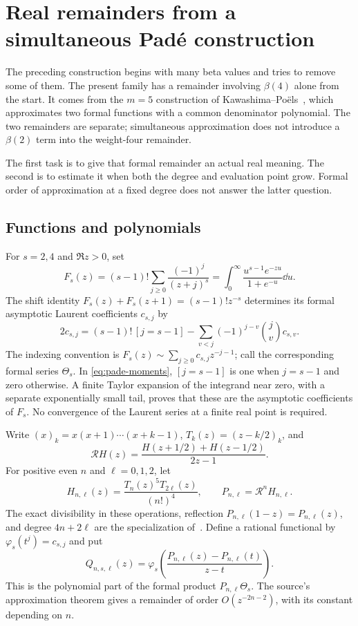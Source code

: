 \section{Real remainders from a simultaneous Pad\'e construction}\label{sec:pade}
The preceding construction begins with many beta values and tries to
remove some of them. The present family has a remainder involving
$\beta(4)$ alone from the start. It comes from the $m=5$ construction
of Kawashima--Po\"els~\cite{KP}, which approximates two formal functions
with a common denominator polynomial. The two remainders are separate;
simultaneous approximation does not introduce a $\beta(2)$ term into
the weight-four remainder.

The first task is to give that formal remainder an actual real meaning.
The second is to estimate it when both the degree and evaluation point
grow. Formal order of approximation at a fixed degree does not answer
the latter question.

\subsection{Functions and polynomials}
For $s=2,4$ and $\Re z>0$, set
\[
 F_s(z)=(s-1)!\sum_{j\ge0}\frac{(-1)^j}{(z+j)^s}
       =\int_0^\infty\frac{u^{s-1}e^{-zu}}{1+e^{-u}}\dd u.
\]
The shift identity $F_s(z)+F_s(z+1)=(s-1)!z^{-s}$ determines its
formal asymptotic Laurent coefficients $c_{s,j}$ by
\begin{equation}\label{eq:pade-moments}
 2c_{s,j}=(s-1)!\,[j=s-1]
              -\sum_{v<j}(-1)^{j-v}\binom jv c_{s,v}.
\end{equation}
The indexing convention is $F_s(z)\sim\sum_{j\ge0}c_{s,j}z^{-j-1}$;
call the corresponding formal series $\Theta_s$. In
\eqref{eq:pade-moments}, $[j=s-1]$ is one when $j=s-1$ and zero otherwise.
A finite Taylor expansion of the integrand near zero, with a separate
exponentially small tail, proves that these are the asymptotic
coefficients of $F_s$. No convergence of the Laurent series at a
finite real point is required.

Write $(x)_k=x(x+1)\cdots(x+k-1)$, $T_k(z)=(z-k/2)_k$, and
\[
 \mathcal R H(z)=\frac{H(z+1/2)+H(z-1/2)}{2z-1}.
\]
For positive even $n$ and $\ell=0,1,2$, let
\[
 H_{n,\ell}(z)=\frac{T_n(z)^5T_{2\ell}(z)}{(n!)^4},\qquad
 P_{n,\ell}=\mathcal R^nH_{n,\ell}.
\]
The exact divisibility in these operations, reflection
$P_{n,\ell}(1-z)=P_{n,\ell}(z)$, and degree $4n+2\ell$ are
the specialization of~\cite[Lemma 6.5]{KP}. Define a rational
functional by $\varphi_s(t^j)=c_{s,j}$ and put
\[
 Q_{n,s,\ell}(z)=\varphi_s\left(
                  \frac{P_{n,\ell}(z)-P_{n,\ell}(t)}{z-t}\right).
\]
This is the polynomial part of the formal product $P_{n,\ell}\Theta_s$.
The source's approximation theorem gives a remainder of order
$O(z^{-2n-2})$, with its constant depending on $n$.

